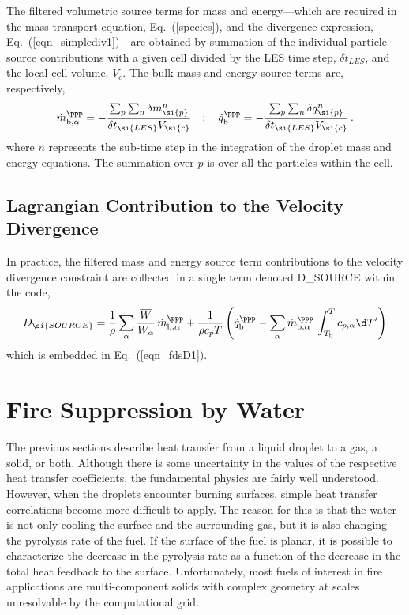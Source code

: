 The filtered volumetric source terms for mass and energy---which are required in the mass transport equation, Eq.~(\ref{species}), and the divergence expression, Eq.~(\ref{eqn_simplediv1})---are obtained by summation of the individual particle source contributions with a given cell divided by the LES time step, $\delta t_{\si{LES}}$, and the local cell volume, $V_{\si{c}}$. The bulk mass and energy source terms are, respectively,
\begin{equation}
\label{eq:bulk_source}
\dot{m}_{{\rm b},\alpha}^{\ppp} = - \frac{ \sum_p \sum_n \delta m_{\si{p}}^n }{\delta t_{\si{LES}} V_{\si{c}}} \quad ; \quad
\dot{q}_{\rm b}^{\ppp} = - \frac{ \sum_p \sum_n \delta q_{\si{p}}^n }{\delta t_{\si{LES}} V_{\si{c}}} \,\mbox{.}
\end{equation}
where $n$ represents the sub-time step in the integration of the droplet mass and energy equations.  The summation over $p$ is over all the particles within the cell.

\subsection{Lagrangian Contribution to the Velocity Divergence}

In practice, the filtered mass and energy source term contributions to the velocity divergence constraint are collected in a single term denoted {\ct D\_SOURCE} within the code,
\begin{equation}
D_{\si{\tiny SOURCE}} = \frac{1}{\rho} \sum_\alpha \frac{\overline{W}}{W_\alpha} \, \dot{m}_{{\rm b},\alpha}^{\ppp} + \frac{1}{\rho c_p T} \left( \dot{q}_{\rm b}^{\ppp} - \sum_\alpha \dot{m}_{{\rm b},\alpha}^{\ppp} \, \int_{T_{\rm b}}^T c_{p,\alpha} \d T'  \right)
\label{eq:D_SOURCE_vap}
\end{equation}
which is embedded in Eq.~(\ref{eqn_fdsD1}).

\section{Fire Suppression by Water}

The previous sections describe heat transfer from a liquid droplet to a gas, a solid, or both. Although there is some
uncertainty in the values of the respective heat transfer coefficients,
the fundamental physics are fairly well understood. However, when
the droplets encounter burning surfaces,
simple heat transfer correlations become more difficult to apply.
The reason for this is that the water is not only cooling the surface
and the surrounding gas, but it is also changing the pyrolysis rate
of the fuel. If the surface of the fuel is planar, it is possible
to characterize the decrease in the pyrolysis rate as a function of
the decrease in the total heat feedback to the surface. Unfortunately,
most fuels of interest in fire applications are multi-component solids
with complex geometry at scales unresolvable by the computational grid.

